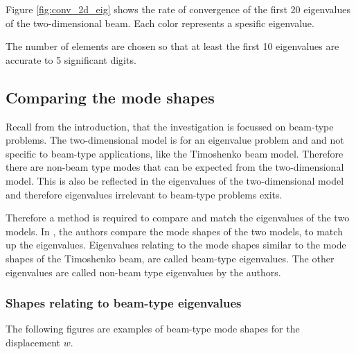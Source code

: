 \documentclass[../../main.tex]{subfiles}
\begin{document}
Figure \ref{fig:conv_2d_eig} shows the rate of convergence of the first 20 eigenvalues of the two-dimensional beam. Each color represents a spesific eigenvalue.

The number of elements are chosen so that at least the first 10 eigenvalues are accurate to 5 significant digits.

\subsection{Comparing the mode shapes}
Recall from the introduction, that the investigation is focussed on beam-type problems. The two-dimensional model is for an eigenvalue problem and and not specific to beam-type applications, like the Timoshenko beam model. Therefore there are non-beam type modes that can be expected from the two-dimensional model. This is also be reflected in the eigenvalues of the two-dimensional model and therefore eigenvalues irrelevant to beam-type problems exits.

Therefore a method is required to compare and match the eigenvalues of the two models. In \cite{LVV09}, the authors compare the mode shapes of the two models, to match up the eigenvalues. Eigenvalues relating to the mode shapes similar to the mode shapes of the Timoshenko beam, are called beam-type eigenvalues. The other eigenvalues are called non-beam type eigenvalues by the authors.

\subsubsection{Shapes relating to beam-type eigenvalues}
The following figures are examples of beam-type mode shapes for the displacement $w$.
\end{document}
